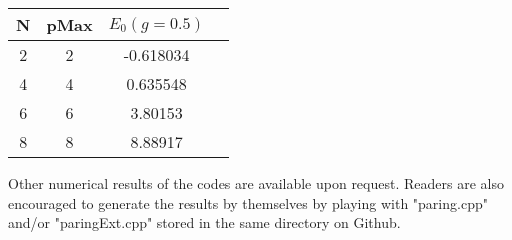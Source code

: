 \documentclass[11pt, oneside]{article}   	%
\begin{document}
\begin{table}[H]
  \centering
\begin{tabular}{cccc}
  \toprule
	N & pMax & $E_0 (g = 0.5)$ \\
  \midrule
	2 & 2 & -0.618034 \\
	4 & 4 & 0.635548 \\
	6 & 6 & 3.80153 \\
	8 & 8 & 8.88917 \\
	\bottomrule
  \end{tabular}
\end{table}


Other numerical results of the codes are available upon request. Readers are also encouraged to generate the results by themselves by playing with "paring.cpp" and/or "paringExt.cpp" stored in the same directory on Github.
\end{document}
